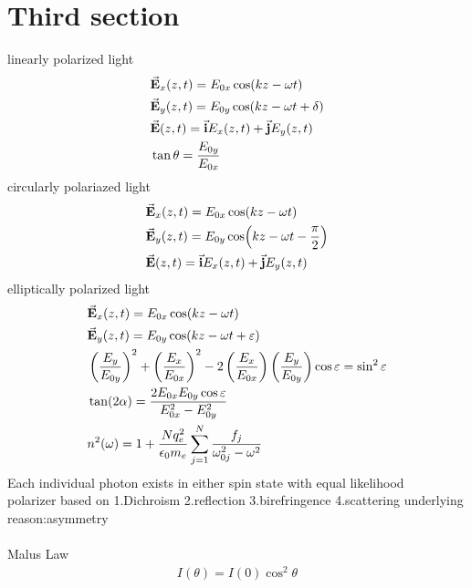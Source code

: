 \documentclass[fleqn,leqno]{article}
\begin{document}
	\section{Third section}
	\mathindent=0mm
		linearly polarized light
	\begin{equation*}
			\begin{split}
				&\va{E}_{x}(z,t)=E_{0x}\cos(kz-\omega t)\\
				&\va{E}_{y}(z,t)=E_{0y}\cos(kz-\omega t+\delta)\\
				&\va{E}(z,t)=\va{i}E_{x}(z,t)+\va{j}E_{y}(z,t)\\
				&\tan{\theta}=\frac{E_{0y}}{E_{0x}}
			\end{split}
	\end{equation*}
		circularly polariazed light
		\begin{equation*}
			\begin{split}
				&\va{E}_{x}(z,t)=E_{0x}\cos(kz-\omega t)\\
				&\va{E}_{y}(z,t)=E_{0y}\cos(kz-\omega t-\frac{\pi}{2})\\
				&\va{E}(z,t)=\va{i}E_{x}(z,t)+\va{j}E_{y}(z,t)
			\end{split}
		\end{equation*}
		elliptically polarized light
		\begin{equation*}
			\begin{split}
				&\va{E}_{x}(z,t)=E_{0x}\cos(kz-\omega t)\\
				&\va{E}_{y}(z,t)=E_{0y}\cos(kz-\omega t+\varepsilon)\\
				&\left(\frac{E_{y}}{E_{0y}}\right)^{2}+\left(\frac{E_{x}}{E_{0x}}\right)^2-2\left(\frac{E_{x}}{E_{0x}}\right)\left(\frac{E_{y}}{E_{0y}}\right)\cos{\varepsilon}=\sin^2{\varepsilon}\\
				&\tan(2\alpha)=\frac{2E_{0x}E_{0y}\cos{\varepsilon}}{E_{0x}^{2}-E_{0y}^{2}}\\
				&n^2(\omega)=1+\frac{Nq^2_{e}}{\epsilon_{0}m_{e}}\sum_{j=1}^{N}\frac{f_{j}}{\omega^2_{0j}-\omega^2}
			\end{split}
		\end{equation*}
			Each individual photon exists in either spin state with equal likelihood\\
			polarizer based on 1.Dichroism 2.reflection 3.birefringence 4.scattering underlying reason:asymmetry\\
		\\	Malus Law
		\begin{equation*}
			\begin{split}
				I(\theta)=I(0)\cos^2{\theta}
			\end{split}
		\end{equation*}
\end{document}

